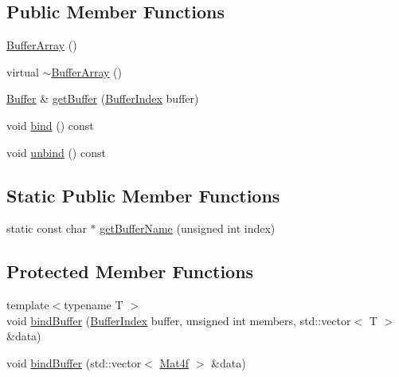\subsection*{Public Member Functions}
\begin{DoxyCompactItemize}
\item 
\hyperlink{classpcs_1_1rend_1_1BufferArray_a8e4885f9616165139b318a1b879691e5}{Buffer\+Array} ()
\item 
virtual \hyperlink{classpcs_1_1rend_1_1BufferArray_a4492755723fc99752c811bfe7520d993}{$\sim$\+Buffer\+Array} ()
\item 
\hyperlink{classpcs_1_1rend_1_1Buffer}{Buffer} \& \hyperlink{classpcs_1_1rend_1_1BufferArray_ad4b43fddb8e19fcaa6fbb8ff80a64a94}{get\+Buffer} (\hyperlink{namespacepcs_1_1rend_a731e43a479c7b7b61dd23586494ee61b}{Buffer\+Index} buffer)
\item 
void \hyperlink{classpcs_1_1rend_1_1BufferArray_ab170f51886678c0c027acdf604915eb7}{bind} () const
\item 
void \hyperlink{classpcs_1_1rend_1_1BufferArray_a8c00f92e0911c209b26cf99fa2920d95}{unbind} () const
\end{DoxyCompactItemize}
\subsection*{Static Public Member Functions}
\begin{DoxyCompactItemize}
\item 
static const char $\ast$ \hyperlink{classpcs_1_1rend_1_1BufferArray_a7ed1705d18349b1e7a08b769f233546a}{get\+Buffer\+Name} (unsigned int index)
\end{DoxyCompactItemize}
\subsection*{Protected Member Functions}
\begin{DoxyCompactItemize}
\item 
{\footnotesize template$<$typename T $>$ }\\void \hyperlink{classpcs_1_1rend_1_1BufferArray_ad31f62704dd0b4c4b6097681aa06c00b}{bind\+Buffer} (\hyperlink{namespacepcs_1_1rend_a731e43a479c7b7b61dd23586494ee61b}{Buffer\+Index} buffer, unsigned int members, std\+::vector$<$ T $>$ \&data)
\item 
void \hyperlink{classpcs_1_1rend_1_1BufferArray_a1f07a68045a6772619641b6059668d34}{bind\+Buffer} (std\+::vector$<$ \hyperlink{structpcs_1_1Mat4f}{Mat4f} $>$ \&data)
\end{DoxyCompactItemize}
